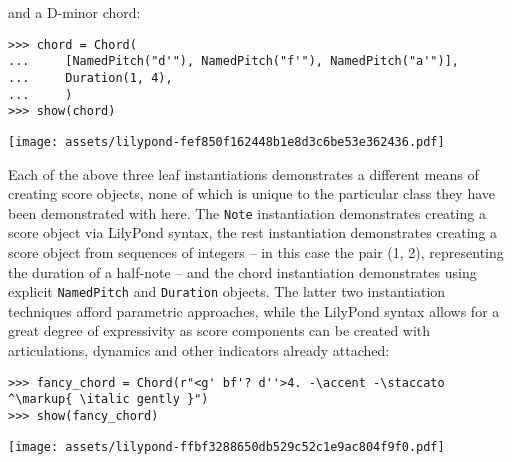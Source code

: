 \noindent and a D-minor chord:

\begin{comment}
<abjad>
chord = Chord(
    [NamedPitch("d'"), NamedPitch("f'"), NamedPitch("a'")],
    Duration(1, 4),
    )
show(chord)
</abjad>
\end{comment}

\begin{abjadbookoutput}
\begin{singlespacing}
\vspace{-0.5\baselineskip}
\begin{verbatim}
>>> chord = Chord(
...     [NamedPitch("d'"), NamedPitch("f'"), NamedPitch("a'")],
...     Duration(1, 4),
...     )
>>> show(chord)
\end{verbatim}
\noindent\texttt{[image: assets/lilypond-fef850f162448b1e8d3c6be53e362436.pdf]}
\end{singlespacing}
\end{abjadbookoutput}

\noindent Each of the above three leaf instantiations demonstrates a different
means of creating score objects, none of which is unique to the particular
class they have been demonstrated with here. The \texttt{Note} instantiation
demonstrates creating a score object via LilyPond syntax, the rest
instantiation demonstrates creating a score object from
sequences of integers -- in this case the pair (1, 2), representing the
duration of a half-note -- and the chord instantiation demonstrates using
explicit \texttt{NamedPitch} and \texttt{Duration} objects. The latter two
instantiation techniques afford parametric approaches, while the LilyPond
syntax allows for a great degree of expressivity as score components can be
created with articulations, dynamics and other indicators already attached:

\begin{comment}
<abjad>
fancy_chord = Chord(r"<g' bf'? d''>4. -\accent -\staccato ^\markup{ \italic gently }")
show(fancy_chord)
</abjad>
\end{comment}

\begin{abjadbookoutput}
\begin{singlespacing}
\vspace{-0.5\baselineskip}
\begin{verbatim}
>>> fancy_chord = Chord(r"<g' bf'? d''>4. -\accent -\staccato ^\markup{ \italic gently }")
>>> show(fancy_chord)
\end{verbatim}
\noindent\texttt{[image: assets/lilypond-ffbf3288650db529c52c1e9ac804f9f0.pdf]}
\end{singlespacing}
\end{abjadbookoutput}

